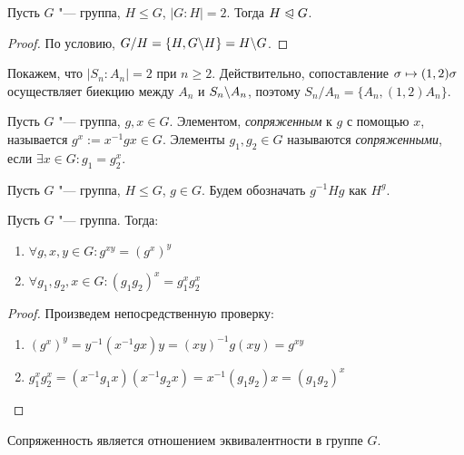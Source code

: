 \begin{proposition}
	Пусть $G$ "--- группа, $H \le G$, $|G : H| = 2$. Тогда $H \trianglelefteqslant G$.
\end{proposition}

\begin{proof}
	По условию, $G / H = \{H, G \backslash H\} = H \backslash G$.
\end{proof}

\begin{note}
	Покажем, что $|S_n : A_n| = 2$ при $n \ge 2$. Действительно, сопоставление $\sigma \hm\mapsto (1, 2)\sigma$ осуществляет биекцию между $A_n$ и $S_n \backslash A_n$, поэтому $S_n / A_n = \{A_n, (1, 2)A_n\}$.
\end{note}

\begin{definition}
	Пусть $G$ "--- группа, $g, x \in G$. Элементом, \textit{сопряженным} к $g$ с помощью $x$, называется $g^x := x^{-1}gx \in G$. Элементы $g_1, g_2 \in G$ называются \textit{сопряженными}, если $\exists x \in G: g_1 = g_2^x$.
\end{definition}

\begin{note}
	Пусть $G$ "--- группа, $H \le G$, $g \in G$. Будем обозначать $g^{-1}Hg$ как $H^g$.
\end{note}

\begin{proposition} Пусть $G$ "--- группа. Тогда:
	\begin{enumerate}
		\item $\forall g, x, y \in G: g^{xy} = (g^x)^y$
		\item $\forall g_1, g_2, x \in G: (g_1g_2)^x = g_1^xg_2^x$
	\end{enumerate}
\end{proposition}

\begin{proof} Произведем непосредственную проверку:
	\begin{enumerate}
		\item $(g^x)^y = y^{-1}(x^{-1}gx)y = (xy)^{-1}g(xy) = g^{xy}$
		\item $g_1^xg_2^x = (x^{-1}g_1x)(x^{-1}g_2x) = x^{-1}(g_1g_2)x = (g_1g_2)^x$
	\end{enumerate}
\end{proof}

\begin{proposition}
	Сопряженность является отношением эквивалентности в группе $G$.
\end{proposition}

